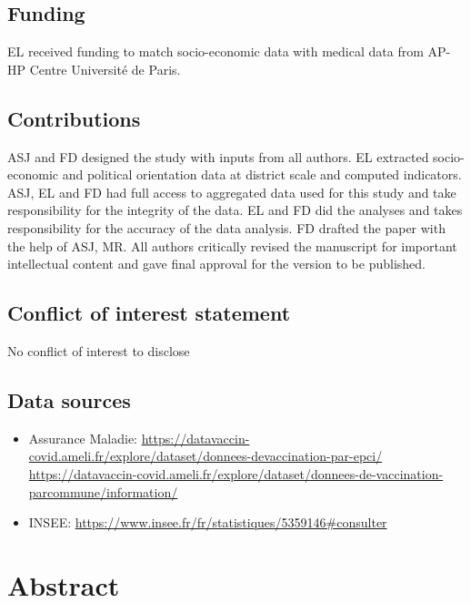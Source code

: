 \documentclass[
]{article}
\providecommand{\tightlist}{%
  \setlength{\itemsep}{0pt}\setlength{\parskip}{0pt}}
\begin{document}
\hypertarget{funding}{%
\subsection{Funding}\label{funding}}

EL received funding to match socio-economic data with medical data from
AP-HP Centre Université de Paris.

\hypertarget{contributions}{%
\subsection{Contributions}\label{contributions}}

ASJ and FD designed the study with inputs from all authors. EL extracted
socio-economic and political orientation data at district scale and
computed indicators. ASJ, EL and FD had full access to aggregated data
used for this study and take responsibility for the integrity of the
data. EL and FD did the analyses and takes responsibility for the
accuracy of the data analysis. FD drafted the paper with the help of
ASJ, MR. All authors critically revised the manuscript for important
intellectual content and gave final approval for the version to be
published.

\hypertarget{conflict-of-interest-statement}{%
\subsection{Conflict of interest
statement}\label{conflict-of-interest-statement}}

No conflict of interest to disclose

\hypertarget{data-sources}{%
\subsection{Data sources}\label{data-sources}}

\begin{itemize}
\tightlist
\item
  Assurance Maladie:
  \url{https://datavaccin-covid.ameli.fr/explore/dataset/donnees-devaccination-par-epci/}
  \url{https://datavaccin-covid.ameli.fr/explore/dataset/donnees-de-vaccination-parcommune/information/}
\item
  INSEE: \url{https://www.insee.fr/fr/statistiques/5359146\#consulter}
\end{itemize}

\hypertarget{abstract}{%
\section{Abstract}\label{abstract}}
\end{document}
